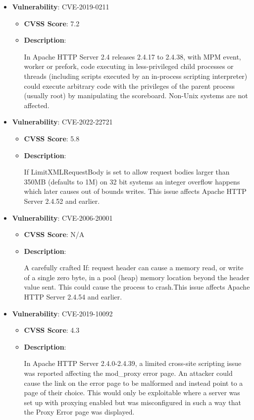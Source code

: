 \documentclass{article}
\begin{document}
\begin{itemize}
        \item \textbf{Vulnerability}: CVE-2019-0211
        \begin{itemize}
            \item \textbf{CVSS Score}:  7.2 
            \item \textbf{Description}:
            \parbox[t]{0.9\linewidth}{
                \ttfamily In Apache HTTP Server 2.4 releases 2.4.17 to 2.4.38, with MPM event, worker or prefork, code executing in less-privileged child processes or threads (including scripts executed by an in-process scripting interpreter) could execute arbitrary code with the privileges of the parent process (usually root) by manipulating the scoreboard. Non-Unix systems are not affected.
            }
        \end{itemize}
    
        \item \textbf{Vulnerability}: CVE-2022-22721
        \begin{itemize}
            \item \textbf{CVSS Score}:  5.8 
            \item \textbf{Description}:
            \parbox[t]{0.9\linewidth}{
                \ttfamily If LimitXMLRequestBody is set to allow request bodies larger than 350MB (defaults to 1M) on 32 bit systems an integer overflow happens which later causes out of bounds writes. This issue affects Apache HTTP Server 2.4.52 and earlier.
            }
        \end{itemize}
    
        \item \textbf{Vulnerability}: CVE-2006-20001
        \begin{itemize}
            \item \textbf{CVSS Score}:  N/A 
            \item \textbf{Description}:
            \parbox[t]{0.9\linewidth}{
                \ttfamily A carefully crafted If: request header can cause a memory read, or write of a single zero byte, in a pool (heap) memory location beyond the header value sent. This could cause the process to crash.This issue affects Apache HTTP Server 2.4.54 and earlier.
            }
        \end{itemize}
    
        \item \textbf{Vulnerability}: CVE-2019-10092
        \begin{itemize}
            \item \textbf{CVSS Score}:  4.3 
            \item \textbf{Description}:
            \parbox[t]{0.9\linewidth}{
                \ttfamily In Apache HTTP Server 2.4.0-2.4.39, a limited cross-site scripting issue was reported affecting the mod\_proxy error page. An attacker could cause the link on the error page to be malformed and instead point to a page of their choice. This would only be exploitable where a server was set up with proxying enabled but was misconfigured in such a way that the Proxy Error page was displayed.
            }
        \end{itemize}
    

\end{itemize}
\end{document}
